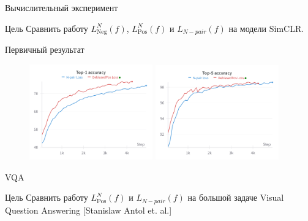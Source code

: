 \documentclass{beamer}
\begin{document}
\begin{frame}{Вычислительный эксперимент}
\begin{block}{Цель}
Сравнить работу $L_{\text{Neg}}^N(f)$, $L_{\text{Pos}}^N(f)$ и $L_{N-pair}(f)$ на модели SimCLR.
\end{block}

\begin{block}{Первичный результат}
\begin{figure}
   \includegraphics[width=0.475\textwidth]{Presentation/W&B Chart 14.12.2023, 18_23_46 (1).png}
   \hfill
   \includegraphics[width=0.475\textwidth]{Presentation/W&B Chart 14.12.2023, 18_29_05.png}
\end{figure}
\end{block}

\end{frame}
\begin{frame}{VQA} 
\begin{block}{Цель}
Сравнить работу $L_{\text{Pos}}^N(f)$ и $L_{N-pair}(f)$ на большой задаче Visual Question Answering [Stanislaw Antol et. al.]
\end{block}
\end{frame}
\end{document}
